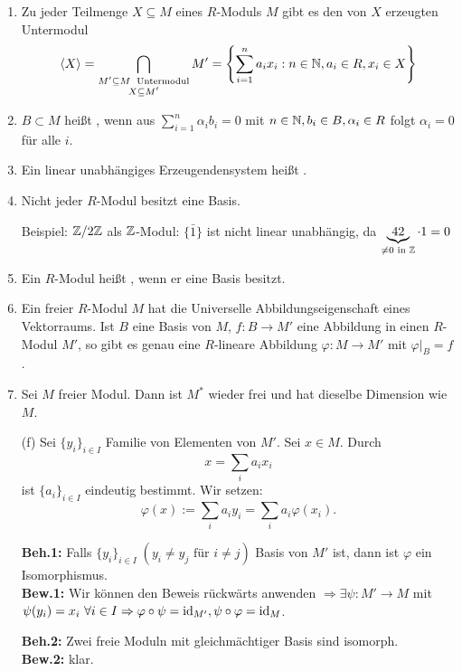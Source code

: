 \documentclass[a4paper, 10pt]{report}
\begin{document}
\begin{Bem}
  \begin{enumerate}
    \item Zu jeder Teilmenge $X \subseteq M$ eines $R$-Moduls $M$ gibt es den von
          $X$ erzeugten Untermodul $$\langle X \rangle = \displaystyle 
          \bigcap_{\substack{M' \subseteq M\; \text{ Untermodul} \\ X \subseteq M'}} M' = \left\{
          \sum_{i=1}^n a_i x_i: n \in \mathbb{N}, a_i \in R, x_i \in X \right\}$$
    \item $B \subset M$ heißt ,
          wenn aus $\displaystyle \sum_{i=1}^n \alpha_i b_i = 0$ mit $n \in
          \mathbb{N}, b_i \in B, \alpha_i \in R$ folgt $\alpha_i = 0$ für alle
          $i$.
    \item Ein linear unabhängiges Erzeugendensystem heißt
          .
    \item Nicht jeder $R$-Modul besitzt eine Basis.

          Beispiel: $\mathbb{Z}/2\mathbb{Z}$ als $\mathbb{Z}$-Modul: $\{\bar{1}\}$
          ist nicht linear unabhängig, da $\underbrace{42}_{\not= 0 \text{ in } \mathbb{Z}} \cdot 1 = 0$
    \item Ein $R$-Modul heißt , wenn er eine
          Basis besitzt.
    \item Ein freier $R$-Modul $M$ hat die Universelle Abbildungseigenschaft eines Vektorraums. Ist $B$ eine
          Basis von $M$, $f: B \to M'$ eine Abbildung in einen $R$-Modul $M'$, so
          gibt es genau eine $R$-lineare Abbildung $\varphi: M \to M'$ mit
          $\varphi|_B = f$.
    \item Sei $M$ freier Modul. Dann ist $M^*$ wieder frei und hat dieselbe
          Dimension wie $M$.
  \end{enumerate}
\end{Bem}

\begin{Bew}
\begin{enumerate}
\item[(f)] Sei $\{y_i\}_{i \in I}$ Familie von Elementen von $M'$.
Sei $x \in M$. Durch
\[
x=\sum_{i}a_ix_i
\]
ist $\{a_i\}_{i  \in I}$ eindeutig bestimmt. Wir setzen:
\[
\varphi(x):=\sum_i a_iy_i=\sum_ia_i\varphi(x_i).
\]

\textbf{Beh.1:} Falls $\{y_i\}_{i\in I}\;(y_i \neq y_j \text{ für } i\neq
j)$ Basis von $M'$ ist, dann ist $\varphi$ ein Isomorphismus.\\
\textbf{Bew.1:} Wir können den Beweis rückwärts anwenden
$\Rightarrow \exists \psi:
M' \rightarrow M$  mit $\psi(y_i)=x_i \ \forall i \in I \Rightarrow
\varphi \circ \psi = \mathrm{id}_{M'}, \psi \circ \varphi = \mathrm{id}_M$.

\textbf{Beh.2:} Zwei freie Moduln mit gleichmächtiger Basis sind isomorph.\\
\textbf{Bew.2:} klar.
\end{enumerate}
\end{Bew}
\end{document}
